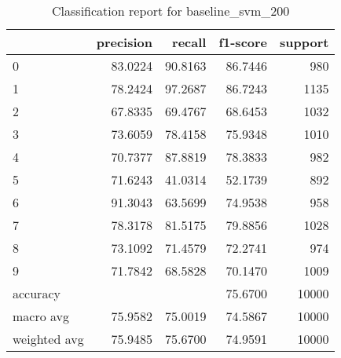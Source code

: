 \begin{table}[htb!]
\centering
\begin{tabular}{lrrrr}
    \toprule
 & precision & recall & f1-score & support \\
 \midrule
 0 & 83.0224 & 90.8163 & 86.7446 & 980 \\
 1 & 78.2424 & 97.2687 & 86.7243 & 1135 \\
 2 & 67.8335 & 69.4767 & 68.6453 & 1032 \\
 3 & 73.6059 & 78.4158 & 75.9348 & 1010 \\
 4 & 70.7377 & 87.8819 & 78.3833 & 982 \\
 5 & 71.6243 & 41.0314 & 52.1739 & 892 \\
 6 & 91.3043 & 63.5699 & 74.9538 & 958 \\
 7 & 78.3178 & 81.5175 & 79.8856 & 1028 \\
 8 & 73.1092 & 71.4579 & 72.2741 & 974 \\
 9 & 71.7842 & 68.5828 & 70.1470 & 1009 \\
 accuracy & & & 75.6700 & 10000 \\
 macro avg & 75.9582 & 75.0019 & 74.5867 & 10000 \\
 weighted avg & 75.9485 & 75.6700 & 74.9591 & 10000 \\
 \bottomrule
\end{tabular}
\caption{Classification report for baseline\_svm\_200}
\label{tab:classification-report-baseline_svm_200}
\end{table}
